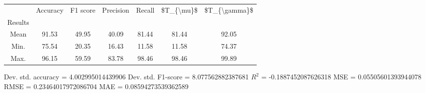 \begin{tabular}{|c|c|c|c|c|c|c|}
\toprule
{} &  Accuracy &  F1 score &  Precision &  Recall &  \$T\_\{\textbackslash mu\}\$ &  \$T\_\{\textbackslash gamma\}\$ \\
Results &           &           &            &         &            &               \\
\hline
Mean    &     91.53 &     49.95 &      40.09 &   81.44 &      81.44 &         92.05 \\
Min.    &     75.54 &     20.35 &      16.43 &   11.58 &      11.58 &         74.37 \\
Max.    &     96.15 &     59.59 &      83.78 &   98.46 &      98.46 &         99.89 \\
\bottomrule
\end{tabular}

 Dev. std. accuracy = 4.002995014439906
 Dev. std. F1-score = 8.077562882387681
 $R^2$ = -0.1887452087626318
 MSE = 0.05505601393944078
 RMSE = 0.23464017972086704
 MAE = 0.08594273539362589